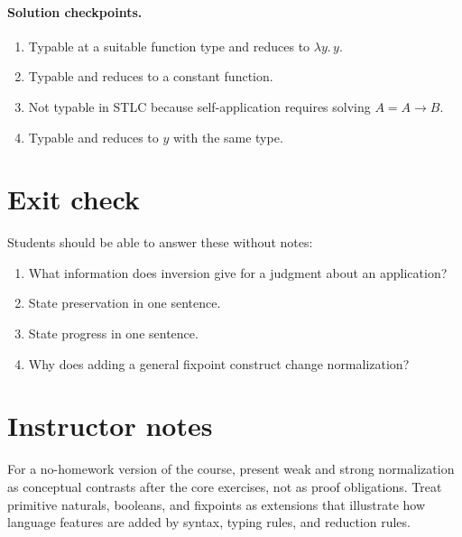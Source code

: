 \documentclass[11pt]{article}
\newcommand{\lam}[1]{\lambda #1.\,}
\begin{document}
\paragraph{Solution checkpoints.}
\begin{enumerate}[nosep]
  \item Typable at a suitable function type and reduces to $\lam{y}y$.
  \item Typable and reduces to a constant function.
  \item Not typable in STLC because self-application requires solving $A = A \to B$.
  \item Typable and reduces to $y$ with the same type.
\end{enumerate}

\section*{Exit check}
Students should be able to answer these without notes:
\begin{enumerate}[nosep]
  \item What information does inversion give for a judgment about an application?
  \item State preservation in one sentence.
  \item State progress in one sentence.
  \item Why does adding a general fixpoint construct change normalization?
\end{enumerate}

\section*{Instructor notes}
For a no-homework version of the course, present weak and strong normalization as conceptual contrasts after the core exercises, not as proof obligations. Treat primitive naturals, booleans, and fixpoints as extensions that illustrate how language features are added by syntax, typing rules, and reduction rules.
\end{document}
